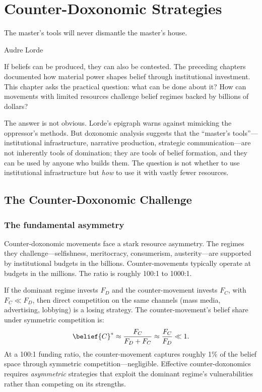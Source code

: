 \chapter{Counter-Doxonomic Strategies}
\label{ch:counter-doxonomic}

\epigraph{The master's tools will never dismantle the master's house.}{Audre Lorde}

\noindent
If beliefs can be produced, they can also be contested.
The preceding chapters documented how material power shapes belief through institutional investment.
This chapter asks the practical question: what can be done about it?
How can movements with limited resources challenge belief regimes backed by billions of dollars?

The answer is not obvious.
Lorde's epigraph warns against mimicking the oppressor's methods.
But doxonomic analysis suggests that the ``master's tools''---institutional infrastructure, narrative production, strategic communication---are not inherently tools of domination; they are tools of belief formation, and they can be used by anyone who builds them.
The question is not whether to use institutional infrastructure but \emph{how} to use it with vastly fewer resources.

\section{The Counter-Doxonomic Challenge}
\label{sec:ch31-challenge}

\subsection{The fundamental asymmetry}

Counter-doxonomic movements face a stark resource asymmetry.
The regimes they challenge---selfishness, meritocracy, consumerism, austerity---are supported by institutional budgets in the billions.
Counter-movements typically operate at budgets in the millions.
The ratio is roughly 100:1 to 1000:1.

\begin{proposition}
\label{prop:resource-asymmetry}
If the dominant regime invests $F_D$ and the counter-movement invests $F_C$, with $F_C \ll F_D$, then direct competition on the same channels (mass media, advertising, lobbying) is a losing strategy.
The counter-movement's belief share under symmetric competition is:
\[
  \belief{C}^* \approx \frac{F_C}{F_D + F_C} \approx \frac{F_C}{F_D} \ll 1.
\]
At a 100:1 funding ratio, the counter-movement captures roughly 1\% of the belief space through symmetric competition---negligible.
Effective counter-doxonomics requires \emph{asymmetric} strategies that exploit the dominant regime's vulnerabilities rather than competing on its strengths.
\end{proposition}


